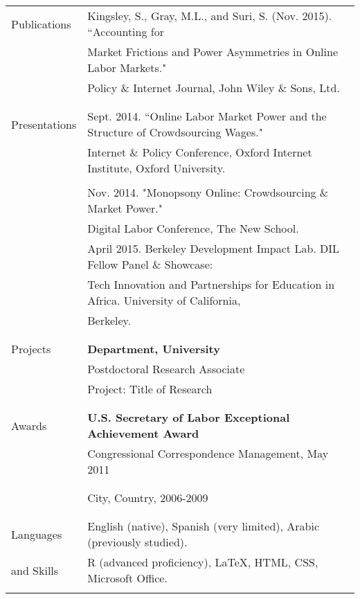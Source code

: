 \documentclass[letterpaper,11pt,oneside]{article}
\begin{document}
\newpage


\noindent \begin{tabular}{@{} l l}
\Large{Publications}    & Kingsley, S., Gray, M.L., and Suri, S. (Nov. 2015). ``Accounting for \\
\Large{} & Market Frictions and Power Asymmetries in Online Labor Markets." \\
\Large{} & Policy \& Internet Journal, John Wiley \& Sons, Ltd. \\
    & \\
    & \\
\Large{Presentations}    & Sept. 2014. ``Online Labor Market Power and the Structure of Crowdsourcing Wages." \\ 
\Large{} & Internet \& Policy Conference, Oxford Internet Institute, Oxford University. \\
& \\
\Large{}  & Nov. 2014. "Monopsony Online: Crowdsourcing \& Market Power."  \\     & Digital Labor Conference, The New School.
    & \\
\Large{}  & April 2015. Berkeley Development Impact Lab. DIL Fellow Panel \& Showcase: \\
    & Tech Innovation and Partnerships for Education in Africa. University of California, \\
    & Berkeley. \\
    & \\
\Large{} 
    & \\
\Large{Projects}    & \textbf{Department, University} \\
     & Postdoctoral Research Associate \\
     & Project: Title of Research \\
     & \\
     & \\
\Large{Awards}    & \textbf{U.S. Secretary of Labor Exceptional Achievement Award} \\
  \Large{}   & Congressional Correspondence Management, May 2011 \\
     & \\
     & \textbf{} \\
     & City, Country, 2006-2009 \\
     & \\
     & \\
  \Large{Languages}   & English (native), Spanish (very limited), Arabic (previously studied). \\
\Large{and Skills}    & R (advanced proficiency), \LaTeX, HTML, CSS, Microsoft Office.  \\
\vspace{1em}
\end{tabular}
\end{document}

